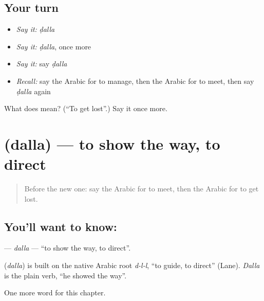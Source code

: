 \subsection*{Your turn}
\begin{itemize}
\raggedright
  \item \emph{Say it:} \emph{ḍalla}
  \item \emph{Say it:} \emph{ḍalla}, once more
  \item \emph{Say it:} say \emph{ḍalla}
  \item \emph{Recall:} say the Arabic for to manage, then the Arabic for to meet, then say \emph{ḍalla} again
\end{itemize}

\begin{tcolorbox}[breakable,colback=teal!4,colframe=teal!35!black,title={Before you move on}]
What does  mean? (\textquotedblleft{}To get lost\textquotedblright{}.) Say it once more.
\end{tcolorbox}
\section[\texorpdfstring{\ar{دل} (dalla)}{دل (dalla)}]{ (dalla) — to show the way, to direct}

\label{lesson:AR-C195-dalla2}



\begin{quote}
Before the new one: say the Arabic for to meet, then the Arabic for to get lost.
\end{quote}

\subsection*{You'll want to know: }
\textbf{} — \emph{dalla} — \textquotedblleft{}to show the way, to direct\textquotedblright{}.

\begin{cousinweb}
\textbf{} (\emph{dalla}) is built on the native Arabic root \emph{d-l-l}, \textquotedblleft{}to guide, to direct\textquotedblright{} (Lane). \emph{Dalla} is the plain verb, \textquotedblleft{}he showed the way\textquotedblright{}.
\end{cousinweb}

\begin{grammarlens}[title={What you've built}]
One more word for this chapter.
\end{grammarlens}

